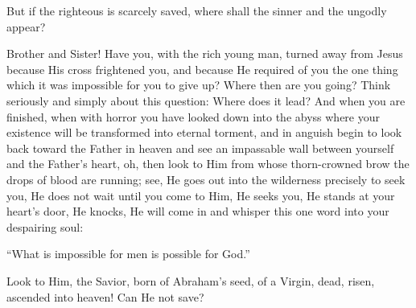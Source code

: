 But if the righteous is scarcely saved, where shall the sinner and the ungodly appear?

Brother and Sister! Have you, with the rich young man, turned away from Jesus because His cross frightened you, and because He required of you the one thing which it was impossible for you to give up? Where then are you going? Think seriously and simply about this question: Where does it lead? And when you are finished, when with horror you have looked down into the abyss where your existence will be transformed into eternal torment, and in anguish begin to look back toward the Father in heaven and see an impassable wall between yourself and the Father’s heart, oh, then look to Him from whose thorn-crowned brow the drops of blood are running; see, He goes out into the wilderness precisely to seek you, He does not wait until you come to Him, He seeks you, He stands at your heart’s door, He knocks, He will come in and whisper this one word into your despairing soul:

“What is impossible for men is possible for God.”

Look to Him, the Savior, born of Abraham’s seed, of a Virgin, dead, risen, ascended into heaven! Can He not save?

